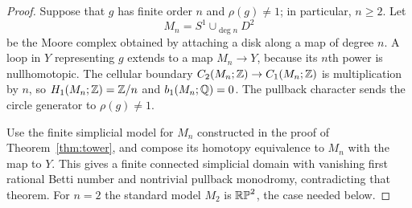 \begin{proof}
Suppose that $g$ has finite order $n$ and $\rho(g)\ne1$; in
particular, $n\geq2$.  Let
\[
  M_n=S^1\cup_{\deg n}D^2
\]
be the Moore complex obtained by attaching a disk along a map of
degree $n$.  A loop in $Y$ representing $g$ extends to a map
$M_n\to Y$, because its $n$th power is nullhomotopic.  The cellular
boundary $C_2(M_n;\mathbb Z)\to C_1(M_n;\mathbb Z)$ is multiplication by $n$,
so $H_1(M_n;\mathbb Z)=\mathbb Z/n$ and $b_1(M_n;\mathbb Q)=0$.  The pullback
character sends the circle generator to $\rho(g)\ne1$.

Use the finite simplicial model for $M_n$ constructed in the proof of
Theorem~\ref{thm:tower}, and compose its homotopy equivalence to
$M_n$ with the map to $Y$.  This gives a finite connected simplicial
domain with vanishing first rational Betti number and nontrivial
pullback monodromy, contradicting that theorem.  For $n=2$ the
standard model $M_2$ is $\mathbb{RP}^2$, the case needed below.
\end{proof}
